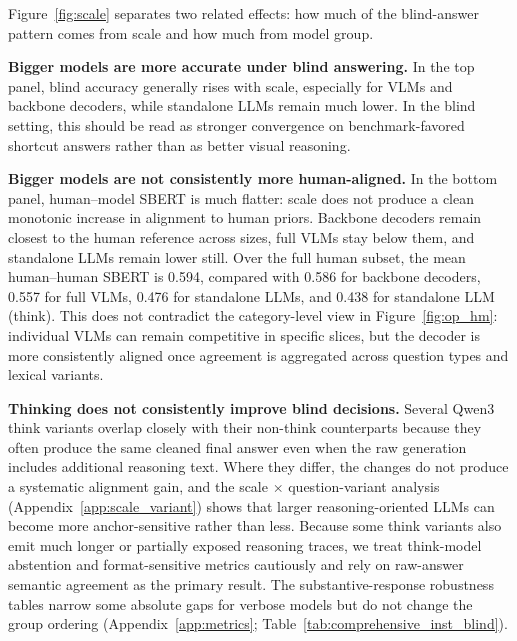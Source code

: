 \documentclass[letterpaper]{article}
\begin{document}
Figure~\ref{fig:scale} separates two related effects: how much of the
blind-answer pattern comes from scale and how much from model group.

\textbf{Bigger models are more accurate under blind answering.} In the top
panel, blind accuracy generally rises with scale, especially for VLMs and
backbone decoders, while standalone LLMs remain much lower. In the blind
setting, this should be read as stronger convergence on benchmark-favored
shortcut answers rather than as better visual reasoning.

\textbf{Bigger models are not consistently more human-aligned.} In the
bottom panel, human--model SBERT is much flatter: scale does not produce a
clean monotonic increase in alignment to human priors. Backbone decoders
remain closest to the human reference across sizes, full VLMs stay below
them, and standalone LLMs remain lower still. Over the full human subset,
the mean human--human SBERT is 0.594, compared with 0.586 for backbone
decoders, 0.557 for full VLMs, 0.476 for standalone LLMs, and 0.438 for
standalone LLM (think). This does not
contradict the category-level view in Figure~\ref{fig:op_hm}: individual
VLMs can remain competitive in specific slices, but the decoder is more
consistently aligned once agreement is aggregated across question types and
lexical variants.

\textbf{Thinking does not consistently improve blind decisions.} Several
Qwen3 think variants overlap closely with their non-think counterparts
because they often produce the same cleaned final answer even when the raw
generation includes additional reasoning text. Where they differ, the changes
do not produce a systematic alignment gain, and the scale $\times$
question-variant analysis (Appendix~\ref{app:scale_variant}) shows that
larger reasoning-oriented LLMs can become more anchor-sensitive rather than
less. Because some think variants also emit much longer or partially exposed
reasoning traces, we treat think-model abstention and format-sensitive
metrics cautiously and rely on raw-answer semantic agreement as the primary
result. The substantive-response robustness tables narrow some absolute gaps
for verbose models but do not change the group ordering
(Appendix~\ref{app:metrics}; Table~\ref{tab:comprehensive_inst_blind}).

\end{document}
